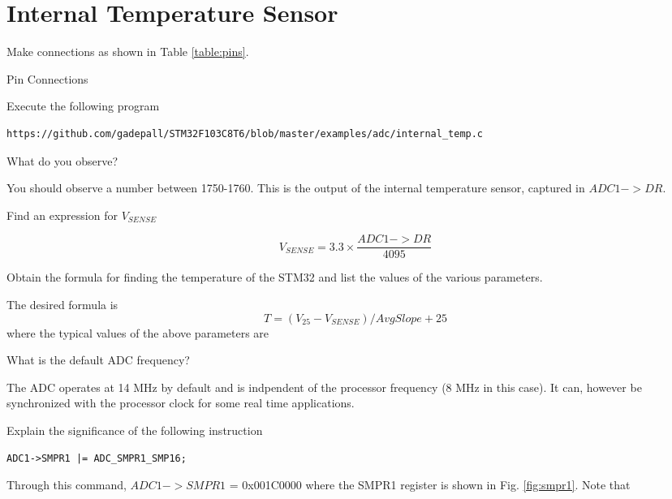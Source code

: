\documentclass[journal,12pt,twocolumn]{IEEEtran}
\begin{document}
\section{Internal Temperature Sensor}
\begin{problem}
Make connections as shown in Table \ref{table:pins}.
\end{problem}
\begin{table}[!h]
\footnotesize

\caption{Pin Connections}
\label{table:pins}
\end{table}
\begin{problem}
Execute the following program
\begin{lstlisting}
https://github.com/gadepall/STM32F103C8T6/blob/master/examples/adc/internal_temp.c
\end{lstlisting}
What do you observe?
\end{problem}
\solution You should observe a number between 1750-1760. This is the output of the internal temperature
sensor, captured in $ADC1->DR$.
\begin{problem}
Find an expression for $V_{SENSE}$
\end{problem}
\solution
\begin{equation}
V_{SENSE} = 3.3 \times \frac{ADC1->DR}{4095}
\end{equation}
%
\begin{problem}
Obtain the formula for finding the temperature of the STM32 and list the values of the various
parameters.
\end{problem}
\solution The desired formula is
\begin{equation}
T = (V_{25}-V_{SENSE})/AvgSlope + 25
\end{equation}
where the typical values of the above parameters are 

%
\begin{problem}
What is the default ADC frequency?
\end{problem}
%
\solution The ADC operates at 14 MHz by default and is indpendent of the processor frequency (8 MHz in this case). It can, however be synchronized with
the processor clock for some real time applications.
\begin{problem}
Explain the significance of the following instruction
\begin{lstlisting}
ADC1->SMPR1 |= ADC_SMPR1_SMP16;
\end{lstlisting}
\end{problem}
\solution Through this command, $ADC1->SMPR1$ = 0x001C0000 where the SMPR1 register is shown in Fig. \ref{fig:smpr1}.  Note that
\end{document}
